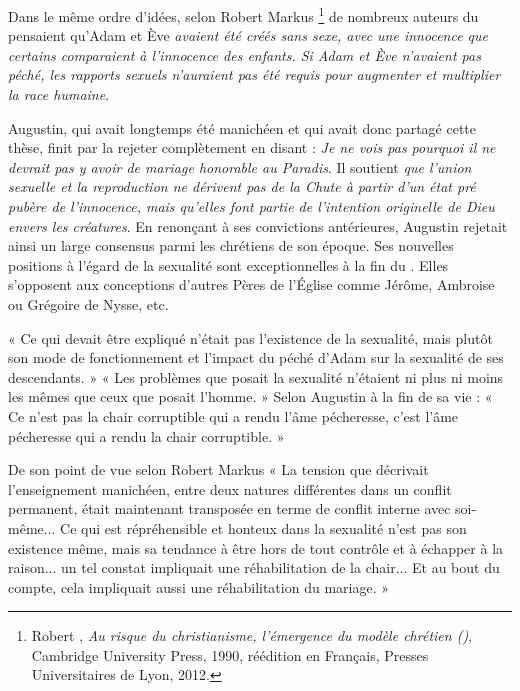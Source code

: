  Dans le même ordre d'idées, selon Robert Markus%
\footnote{Robert , \emph{Au risque du christianisme, l'émergence du modèle chrétien ()}, Cambridge University Press, 1990, réédition en Français, Presses Universitaires de Lyon, 2012.} 
de nombreux auteurs du  pensaient qu'Adam et Ève \emph{avaient été créés sans sexe, avec une innocence que certains comparaient à l'innocence des enfants. Si Adam et Ève n'avaient pas péché, les rapports sexuels n'auraient pas été requis pour augmenter et multiplier la race humaine}.

 Augustin, 
%
qui avait longtemps été manichéen et qui avait donc partagé cette thèse, finit par la rejeter complètement en disant : \emph{Je ne vois pas pourquoi il ne devrait pas y avoir de mariage honorable au Paradis}. Il soutient \emph{que l'union sexuelle et la reproduction ne dérivent pas de la Chute à partir d'un état pré pubère de l'innocence, mais qu'elles font partie de l'intention originelle de Dieu envers les créatures}. En renonçant à ses convictions antérieures, Augustin rejetait ainsi un large consensus parmi les chrétiens de son époque. Ses nouvelles positions à l'égard de la sexualité sont exceptionnelles à la fin du . Elles s'opposent aux conceptions d'autres Pères de l'Église comme Jérôme, Ambroise ou Grégoire de Nysse, etc. 

 « Ce qui devait être expliqué n'était pas l'existence de la sexualité, mais plutôt son mode de fonctionnement et l'impact du péché d'Adam sur la sexualité de ses descendants. » « Les problèmes que posait la sexualité n'étaient ni plus ni moins les mêmes que ceux que posait l'homme. » Selon Augustin à la fin de sa vie : « Ce n'est pas la chair corruptible qui a rendu l'âme pécheresse, c'est l'âme pécheresse qui a rendu la chair corruptible. »

 De son point de vue selon Robert Markus « La tension que décrivait l'enseignement manichéen, entre deux natures différentes dans un conflit permanent, était maintenant transposée en terme de conflit interne avec soi-même... Ce qui est répréhensible et honteux dans la sexualité n'est pas son existence même, mais sa tendance à être hors de tout contrôle et à échapper à la raison... un tel constat impliquait une réhabilitation de la chair... Et au bout du compte, cela impliquait aussi une réhabilitation du mariage. » 

